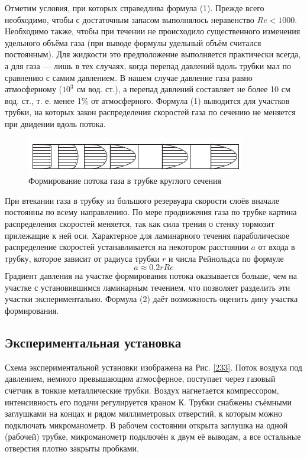 \documentclass[a4paper, 12pt]{article}
\begin{document}
Отметим условия, при которых справедлива формула (1). Прежде всего необходимо, чтобы с достаточным запасом выполнялось неравенство $Re < 1000$. Необходимо также, чтобы при течении не происходило существенного изменения удельного объёма газа (при выводе формулы удельный объём считался постоянным). Для жидкости это предположение выполняется практически всегда, а для газа --- лишь в тех случаях, когда перепад давлений вдоль трубки мал по сравнению с самим давлением. В нашем случае давление газа равно атмосферному ($10^3$ см вод. ст.), а перепад давлений составляет не более 10 см вод. ст., т. е. менее 1\% от атмосферного. Формула (1) выводится для участков трубки, на которых закон распределения скоростей газа по сечению не меняется при двидении вдоль потока.
\begin{figure}[H]
\center
\includegraphics[scale=1]{potok.png}
\caption{Формирование потока газа в трубке круглого сечения}
\end{figure}
При втекании газа в трубку из большого резервуара скорости слоёв вначале постоянны по всему направлению. По мере продвижения газа по трубке картина распределения скоростей меняется, так как сила трения о стенку тормозит прилежащие к ней оси. Характерное для ламинарного течения параболическое распределение скоростей устанавливается на некотором расстоянии $a$ от входа в трубку, которое зависит от радиуса трубки $r$ и числа Рейнольдса по формуле 
\begin{equation}
	a \approx 0.2rRe
\end{equation}
Градиент давления на участке формирования потока оказывается больше, чем на участке с установившимся ламинарным течением, что позволяет разделить эти участки экспериментально. Формула (2) даёт возможность оценить дину участка формирования.

\begin{center}
\subsection*{Экспериментальная установка}    
\end{center}

Схема экспериментальной установки изображена на Рис. \ref{233}. Поток воздуха
под давлением, немного превышающим атмосферное, поступает через газовый счётчик в тонкие металлические трубки. Воздух нагнетается компрессором, интенсивность его подачи регулируется краном К. Трубки снабжены
съёмными заглушками на концах и рядом миллиметровых отверстий, к которым можно подключать микроманометр. В рабочем состоянии открыта заглушка на одной (рабочей) трубке, микроманометр подключён к двум её выводам, а все остальные отверстия плотно закрыты пробками.
\end{document}
